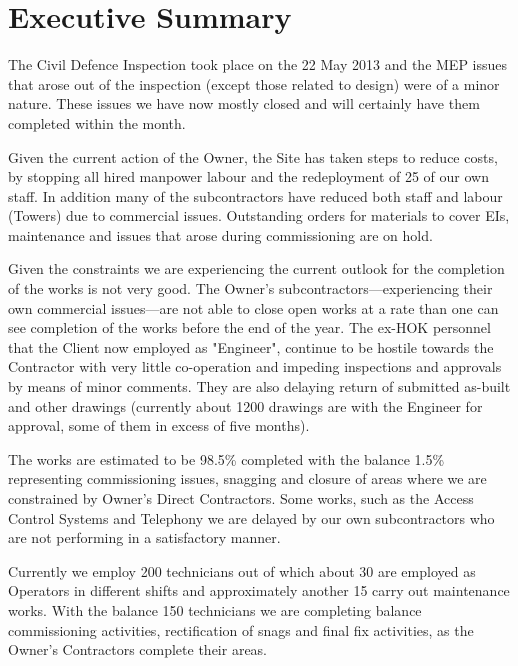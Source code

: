

\makeatletter
\newenvironment{update}{\quotation}{\endquotation}
\makeatother
\chapter*{Executive Summary}




The Civil Defence Inspection took place on the 22  May 2013 and the MEP issues that arose out of the inspection (except those related to design) were of a minor nature. These issues we have now mostly closed and will certainly have them completed within the month.

Given the current action of the Owner, the Site has taken steps to reduce costs, by stopping all hired manpower labour and the redeployment of 25 of our own staff. In addition many of the subcontractors have reduced both staff and labour (Towers) due to commercial issues. Outstanding orders for materials to cover EIs, maintenance and issues that arose during commissioning are on hold.

Given the constraints we are experiencing the current outlook for the completion of the works is not very good. The Owner's subcontractors---experiencing their own commercial issues---are not able to close open works at a rate than one can see completion of the works before the end of the year. The ex-HOK personnel that the Client now employed as "Engineer", continue to be hostile towards the Contractor with very little co-operation and impeding inspections and approvals by means of minor comments. They are also delaying return of submitted as-built and other drawings (currently about 1200 drawings are with the Engineer for approval, some of them in excess of five months).

The works are estimated to be 98.5\% completed with the balance 1.5\% representing commissioning issues, snagging and closure of areas where we are constrained by Owner's Direct Contractors. Some works, such as the Access Control Systems and Telephony we are delayed by our own subcontractors who are not performing in a satisfactory manner.

Currently we employ 200 technicians  out of which about 30 are employed as Operators in different shifts and approximately another 15 carry out maintenance works. With the balance 150 technicians we are completing balance commissioning activities, rectification of snags and final fix activities, as the Owner's Contractors complete their areas.

